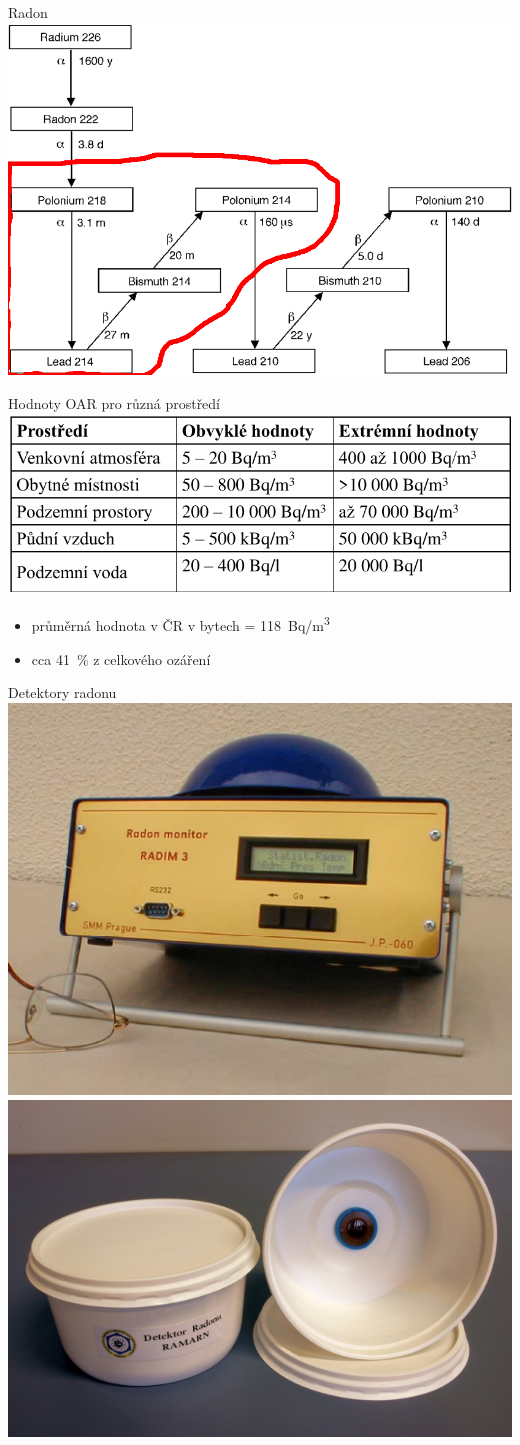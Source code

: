 \documentclass[10pt]{beamer}
\begin{document}
\begin{frame}{Radon}
    \small
    \centering
    \includegraphics[width=.8\textwidth]{radon_chain.png}
\end{frame}

\begin{frame}{Hodnoty OAR pro různá prostředí}
    \small
    \centering
    \includegraphics[width=.8\textwidth]{tabulka_hodnoty_radonu.png}
    \cite{fronka}
    \begin{itemize}
        \item průměrná hodnota v ČR v bytech = \SI{118}{Bq/m^3}
        \item cca \SI{41}{\%} z celkového ozáření
    \end{itemize}
\end{frame}

\begin{frame}{Detektory radonu}
    \small
    \centering
    \includegraphics[width=.45\textwidth]{radim.png}\cite{radim}
    \includegraphics[width=.45\textwidth]{stopac.jpg}
\end{frame}
\end{document}
